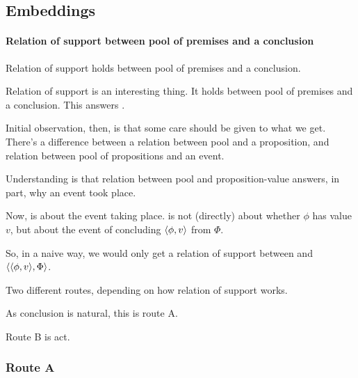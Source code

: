 \subsection{Embeddings}
\label{sec:embeddings}

\paragraph{Relation of support between pool of premises and a conclusion}

\begin{note}
  \begin{observation}
    Relation of support holds between pool of premises and a conclusion.
  \end{observation}
\end{note}

\begin{note}
  Relation of support is an interesting thing.
  It holds between pool of premises and a conclusion.
  This answers \qWhy{}.

  Initial observation, then, is that some care should be given to what we get.
  There's a difference between a relation between pool and a proposition, and relation between pool of propositions and an event.

  Understanding is that relation between pool and proposition-value answers, in part, why an event took place.
\end{note}

\begin{note}
  Now, \qzS{} is about the event taking place.
  \qzS{} is not (directly) about whether \(\phi\) has value \(v\), but about the event of concluding \(\langle \phi, v \rangle\) from \(\Phi\).
\end{note}

\begin{note}
  So, in a naive way, we would only get a relation of support between \fc{} and \(\langle \langle \phi, v \rangle, \Phi \rangle\).
\end{note}

\begin{note}
  Two different routes, depending on how relation of support works.

  As conclusion is natural, this is route A.

  Route B is act.
\end{note}

\subsubsection{Route A}
\label{sec:route-A}

